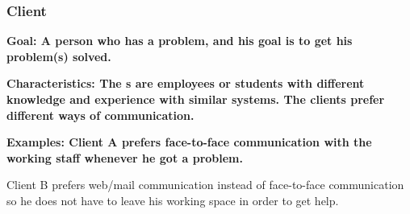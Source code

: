 \subsubsection{Client}

\bf{Goal:} A person who has a problem, and his goal is to get his problem(s) solved.

\bf{Characteristics:} The \client{}s are employees or students with different knowledge and experience with similar systems. The clients prefer different ways of communication.%

\bf{Examples:} Client A prefers face-to-face communication with the working staff whenever he got a problem. 

Client B prefers web/mail communication instead of face-to-face communication so he does not have to leave his working space in order to get help. 

